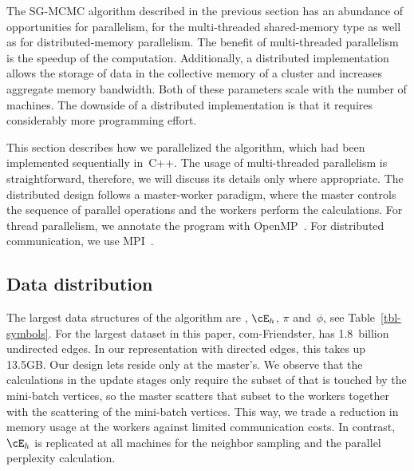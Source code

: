 \begin{comment}
- pi storage: DKV
   . pi/phi is read in 3), 4), 5a), 7)
   . pi is written in 4); read[i], then write[i], so no other data dependencies
   . so access is very synchronous: either read-only, or write without
     concurrent readers
   . DKV store properties:
      - single-sized keys
      - contiguous key space (integers 0..N-1)
      - update-only writes: no new KVs, no deletes
     so: no load imbalance, no hashing that is worth its name
      - no read/write or write/write concurrency
     so:
      - build RDMA store with remote reads and remote writes only, with exactly
        one RDMA transaction per read or write
\end{comment}



The SG-MCMC algorithm described in the previous section has an abundance of
opportunities for parallelism, for the multi-threaded shared-memory type as
well as for distributed-memory parallelism. The benefit of multi-threaded
parallelism is the speedup of the computation. Additionally, a distributed implementation
allows the storage of data in the collective memory of a cluster
and increases aggregate memory bandwidth. Both of these parameters scale with the number of
machines. The downside of a distributed implementation is that it requires
considerably more programming effort.


This section describes how we parallelized the algorithm, which had been
implemented sequentially in~C++.
The usage of multi-threaded parallelism
is straightforward, therefore, we will discuss its details only where appropriate. The
distributed design follows a master-worker paradigm, where
the master controls the sequence of parallel operations and the workers perform the
calculations. For thread parallelism, we annotate the program with
OpenMP~\cite{OpenMPSpec}. For distributed communication, we use
MPI~\cite{Forum:1994:MMI:898758}.


\subsection{Data distribution}


The largest data structures of the algorithm are \Edges, $\cE_h$, $\pi$
and~$\phi$, see Table~\ref{tbl-symbols}.
For the largest dataset in this paper, com-Friendster, \Edges has 1.8~billion
undirected edges. In our representation with directed edges, this takes
up 13.5GB. Our design lets \Edges reside only at the master's. We observe that
the calculations in the update stages only require the subset of \Edges that
is touched by the mini-batch vertices, so the master scatters that subset to
the workers together with the scattering of the mini-batch vertices. This way,
we trade a reduction in memory usage at the workers against limited
communication costs. In contrast, $\cE_h$ is replicated at
all machines for the neighbor sampling and the parallel perplexity calculation.

